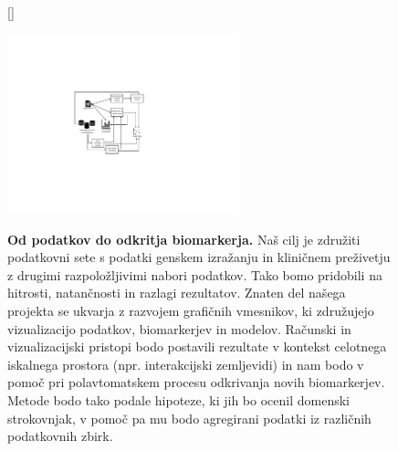 \documentclass[11pt,a4paper]{article}
\renewcommand{\bold}{\textbf}
\begin{document}
\begin{description}
\begin{figure}
[\FBwidth]
{\caption{\small\bold{Od podatkov do odkritja biomarkerja.} Naš cilj je združiti podatkovni sete s podatki genskem izražanju in kliničnem preživetju z drugimi razpoložljivimi nabori podatkov. Tako bomo pridobili na hitrosti, natančnosti in razlagi rezultatov. Znaten del našega projekta se ukvarja z razvojem grafičnih vmesnikov, ki združujejo vizualizacijo podatkov, biomarkerjev in modelov. Računski in vizualizacijski pristopi bodo postavili rezultate v kontekst celotnega iskalnega prostora (npr. interakcijski zemljevidi) in nam bodo v pomoč pri polavtomatskem procesu odkrivanja novih biomarkerjev. Metode bodo tako podale hipoteze, ki jih bo ocenil domenski strokovnjak, v pomoč pa mu bodo agregirani podatki iz različnih podatkovnih zbirk.}
\label{fig:approach}}
{\includegraphics[width=0.6\textwidth]{approach}}
\end{figure}





\end{description}
\end{document}
